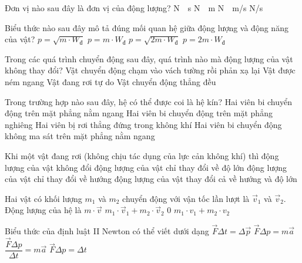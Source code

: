 \begin{ex}
	Đơn vị nào sau đây là đơn vị của động lượng?
	\choice
	{\True\si{\newton\cdot\second}}
	{\si{\newton\cdot\meter}}
	{\si{\newton\cdot\meter/\second}}
	{\si{\newton/\second}}
	\loigiai{}
\end{ex}
\begin{ex}
	Biểu thức nào sau đây mô tả đúng mối quan hệ giữa động lượng và động năng của vật?
	\choice
	{$p=\sqrt{m\cdot W_{\text{đ}}}$}
	{$p=m\cdot W_{\text{đ}}$}
	{\True $p=\sqrt{2m\cdot W_{\text{đ}}}$}
	{$p=2m\cdot W_{\text{đ}}$}
	\loigiai{}
\end{ex}
\begin{ex}
	Trong các quá trình chuyển động sau đây, quá trình nào mà động lượng của vật không thay đổi?
	\choice
	{Vật chuyển động chạm vào vách tường rồi phản xạ lại}
	{Vật được ném ngang}
	{Vật đang rơi tự do}
	{\True Vật chuyển động thẳng đều}
	\loigiai{}
\end{ex}
\begin{ex}
	Trong trường hợp nào sau đây, hệ có thể được coi là hệ kín?
	\choice
	{Hai viên bi chuyển động trên mặt phẳng nằm ngang}
	{Hai viên bi chuyển động trên mặt phẳng nghiêng}
	{Hai viên bị rơi thẳng đứng trong không khí}
	{\True Hai viên bi chuyển động không ma sát trên mặt phẳng nằm ngang}
	\loigiai{}
\end{ex}
\begin{ex}
	Khi một vật đang rơi (không chịu tác dụng của lực cản không khí) thì
	\choice
	{động lượng của vật không đổi}
	{\True động lượng của vật chỉ thay đổi về độ lớn}
	{động lượng của vật chỉ thay đổi về hướng}
	{động lượng của vật thay đổi cả về hướng và độ lớn}
	\loigiai{}
\end{ex}
\begin{ex}
	Hai vật có khối lượng $m_1$ và $m_2$ chuyển động với vận tốc lần lượt là $\vec{v}_1$ và $\vec{v}_2$. Động lượng của hệ là
	\choice
	{$m\cdot\vec{v}$}
	{\True $m_1\cdot\vec{v}_1+m_2\cdot\vec{v}_2$}
	{$0$}
	{$m_1\cdot v_1+m_2\cdot v_2$}
	\loigiai{}
\end{ex}
\begin{ex}
	Biểu thức của định luật II Newton có thể viết dưới dạng
	\choice
	{\True $\vec{F}\Delta t=\Delta \vec{p}$}
	{$\vec{F}\Delta p=m\vec{a}$}
	{$\dfrac{\vec{F}\Delta p}{\Delta t}=m\vec{a}$}
	{$\vec{F}\Delta p=\Delta t$}
	\loigiai{}
\end{ex}
